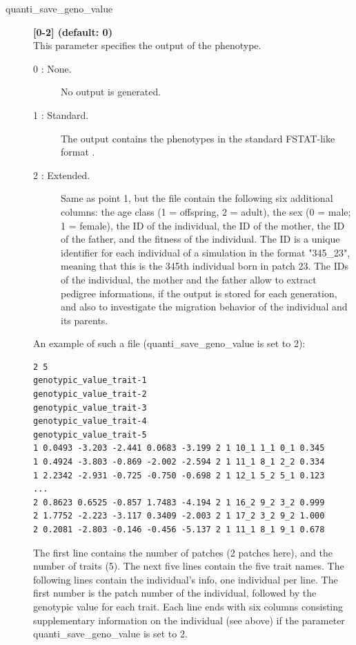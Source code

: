 \documentclass[letterpaper,12pt,oneside]{book}
\begin{document}
\begin{description} 
\item[quanti\_save\_geno\_value] \textbf{[0-2] (default: 0)} \\
This parameter specifies the output of the phenotype.
\begin{description}
\item [0 : None.] No output is generated.
\item [1 : Standard.] The output contains the phenotypes in the standard FSTAT-like format \citep{Goudet_1995}. 
\item [2 : Extended.] Same as point 1, but the file contain the following six additional columns: the age class (1 = offspring, 2 = adult), the sex (0 = male; 1 = female), the ID of the individual, the ID of the mother, the ID of the father, and the fitness of the individual. The ID is a unique identifier for each individual of a simulation in the format "345\_23", meaning that this is the 345th individual born in patch 23. The IDs of the individual, the mother and the father allow to extract pedigree informations, if the output is stored for each generation, and also to investigate the migration behavior of the individual and its parents. 
\end{description} 

An example of such a file (\textsf{quanti\_save\_geno\_value} is set to 2):
\begin{lstlisting}[frame=single]
2 5
genotypic_value_trait-1
genotypic_value_trait-2
genotypic_value_trait-3
genotypic_value_trait-4
genotypic_value_trait-5
1 0.0493 -3.203 -2.441 0.0683 -3.199 2 1 10_1 1_1 0_1 0.345
1 0.4924 -3.803 -0.869 -2.002 -2.594 2 1 11_1 8_1 2_2 0.334
1 2.2342 -2.931 -0.725 -0.750 -0.698 2 1 12_1 5_2 5_1 0.123
...
2 0.8623 0.6525 -0.857 1.7483 -4.194 2 1 16_2 9_2 3_2 0.999
2 1.7752 -2.223 -3.117 0.3409 -2.003 2 1 17_2 3_2 9_2 1.000
2 0.2081 -2.803 -0.146 -0.456 -5.137 2 1 11_1 8_1 9_1 0.678
\end{lstlisting}

The first line contains the number of patches (2 patches here), and the number of traits (5). The next five lines contain the five trait names. The following lines contain the individual's info, one individual per line. The first number is the patch number of the individual, followed by the genotypic value for each trait.  Each line ends with six columns consisting supplementary information on the individual (see above) if the parameter \textsf{quanti\_save\_geno\_value} is set to 2.


\end{description}
\end{document}
